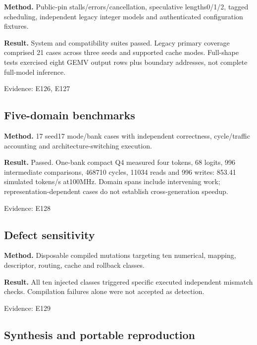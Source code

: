 \documentclass[11pt,a4paper]{article}
\begin{document}
\textbf{Method.} Public-pin stalls/\allowbreak{}errors/\allowbreak{}cancellation,\allowbreak{} speculative lengths0/\allowbreak{}1/\allowbreak{}2,\allowbreak{} tagged scheduling,\allowbreak{} independent legacy integer models and authenticated configuration fixtures.

\textbf{Result.} System and compatibility suites passed. Legacy primary coverage comprised 21 cases across three seeds and supported cache modes. Full-shape tests exercised eight GEMV output rows plus boundary addresses,\allowbreak{} not complete full-model inference.

{\small Evidence: E126,\allowbreak{} E127}

\subsection{Five-domain benchmarks}

\textbf{Method.} 17 seed17 mode/\allowbreak{}bank cases with independent correctness,\allowbreak{} cycle/\allowbreak{}traffic accounting and architecture-switching execution.

\textbf{Result.} Passed. One-bank compact Q4 measured four tokens,\allowbreak{} 68 logits,\allowbreak{} 996 intermediate comparisons,\allowbreak{} 468710 cycles,\allowbreak{} 11034 reads and 996 writes: 853.41 simulated tokens/\allowbreak{}s at100MHz. Domain spans include intervening work; representation-dependent cases do not establish cross-generation speedup.

{\small Evidence: E128}

\subsection{Defect sensitivity}

\textbf{Method.} Disposable compiled mutations targeting ten numerical,\allowbreak{} mapping,\allowbreak{} descriptor,\allowbreak{} routing,\allowbreak{} cache and rollback classes.

\textbf{Result.} All ten injected classes triggered specific executed independent mismatch checks. Compilation failures alone were not accepted as detection.

{\small Evidence: E129}

\subsection{Synthesis and portable reproduction}
\end{document}
